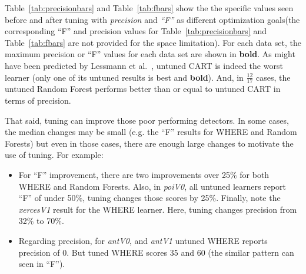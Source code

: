 \documentclass[final,twocolumn,5p]{elsarticle}
\newcommand{\bi}{\begin{itemize}[leftmargin=0.4cm]}
\newcommand{\ei}{\end{itemize}}
\newcommand{\fig}[1]{Figure~\ref{fig:#1}}
\newcommand{\tab}[1]{Table~\ref{tab:#1}}
\begin{document}
 
\tab{precisionbars} and \tab{fbars} show the
the specific values seen before and after tuning with {\em precision}
and {\em ``F''} as different optimization goals(the corresponding  ``F'' and precision values for
\tab{precisionbars} and \tab{fbars} are not provided for the space limitation).
For each data set, the maximum precision or ``F'' values for each data set are shown in {\bf bold}.
As might have been
 predicted by Lessmann et al.~\cite{lessmann2008benchmarking}, 
untuned CART is indeed the worst learner (only one of its
untuned results is best and {\bf bold}). 
And, 
in $\frac{12}{17}$ cases, the  untuned Random Forest performs better than or equal to untuned CART in terms of precision.  




That said,  tuning can improve those poor performing detectors.
In some cases, the median changes may be small (e.g. the ``F'' results for WHERE and Random Forests) but even in
those cases, there are enough large changes to motivate the use of tuning. For example:
\bi
\item
For ``F'' improvement, there are two improvements over 25\% for both WHERE and Random Forests. Also, in {\em poiV0}, all untuned learners report ``F'' of under 50\%, tuning changes those scores by 25\%. Finally, note the  {\em xercesV1} result for the WHERE learner. Here, tuning changes precision from 32\% to 70\%.
\item
Regarding precision, for {\em antV0}, and {\em antV1} untuned WHERE reports precision of 0. But tuned WHERE scores 35 and 60 (the similar pattern can seen in ``F'').

\ei

\end{document}
